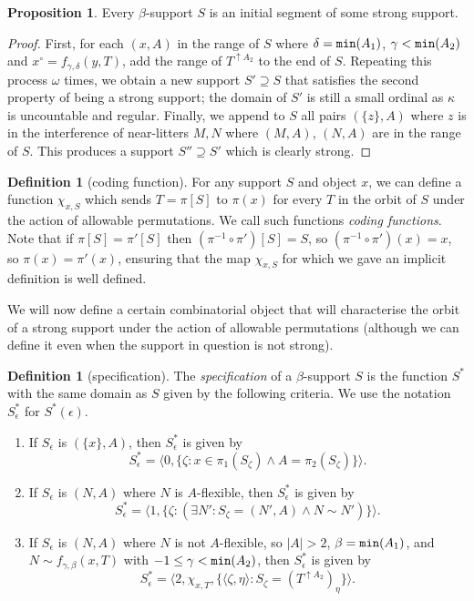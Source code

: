 \documentclass{article}
\theoremstyle{definition}
\newtheorem{proposition}[theorem]{Proposition}
\newtheorem{definition}[theorem]{Definition}
\theoremstyle{remark}
\begin{document}
\begin{proposition}\label{prop:extend_to_strong_support}
Every $\beta$-support $S$ is an initial segment of some strong support.
\end{proposition}
\begin{proof}
First, for each $(x,A)$ in the range of $S$ where $\delta={\tt min}(A_1)$, $\gamma<{\tt min}(A_2)$ and $x^\circ = f_{\gamma,\delta}(y,T)$, add the range of $T^{\uparrow A_2}$ to the end of $S$.
Repeating this process $\omega$ times, we obtain a new support $S' \supseteq S$ that satisfies the second property of being a strong support; the domain of $S'$ is still a small ordinal as $\kappa$ is uncountable and regular.
Finally, we append to $S$ all pairs $(\{z\},A)$ where $z$ is in the interference of near-litters $M,N$ where $(M,A)$, $(N,A)$ are in the range of $S$.
This produces a support $S'' \supseteq S'$ which is clearly strong.
\end{proof}

\begin{definition}[coding function]\label{def:coding_function}
For any support $S$ and object $x$, we can define a function $\chi_{x,S}$ which sends $T=\pi[S]$ to $\pi(x)$ for every $T$ in the orbit of $S$ under
the action of allowable permutations.  We call such functions {\em coding functions\/}.  Note that if $\pi[S]=\pi'[S]$ then $(\pi^{-1}\circ \pi')[S]= S$, so
$(\pi^{-1}\circ \pi')(x)= x$, so $\pi(x)=\pi'(x)$, ensuring that the map $\chi_{x,S}$ for which we gave an implicit definition is well defined.
\end{definition}

We will now define a certain combinatorial object that will characterise the orbit of a strong support under the action of allowable permutations (although we can define it even when the support in question is not strong).

\begin{definition}[specification]
The {\em specification\/} of a $\beta$-support $S$ is the function $S^*$ with the same domain as $S$ given by the following criteria.
We use the notation $S^*_\epsilon$ for $S^*(\epsilon)$.

\begin{enumerate}

\item If $S_\epsilon$ is $(\{x\},A)$, then $S^*_\epsilon$ is given by
$$ S^*_\epsilon = \langle 0, \{ \zeta : x \in \pi_1(S_\zeta) \wedge A = \pi_2(S_\zeta) \}\rangle. $$
\item If $S_\epsilon$ is $(N,A)$ where $N$ is $A$-flexible, then $S^*_\epsilon$ is given by
$$ S^*_\epsilon = \langle 1, \{ \zeta : (\exists N' : S_\zeta = (N',A) \wedge N \sim N') \} \rangle. $$
\item If $S_\epsilon$ is $(N,A)$ where $N$ is not $A$-flexible, so $|A| > 2$, $\beta = {\tt min}(A_1)$, and $N \sim f_{\gamma,\beta}(x,T)$ with $-1\leq\gamma<{\tt min}(A_2)$, then $S^*_\epsilon$ is given by
$$ S^*_\epsilon = \langle 2, \chi_{x,T}, \{ \langle \zeta, \eta \rangle : S_\zeta = (T^{\uparrow A_2})_\eta \} \rangle. $$

\end{enumerate}
\end{definition}
\end{document}
